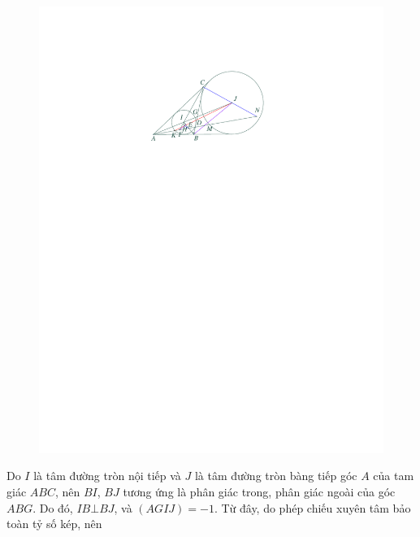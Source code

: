 \begin{multicols}{2}
\begin{figure}[H]
		\centering
		\captionsetup{labelformat= empty, justification=centering}
		\includegraphics[width= 1\linewidth]{P738}
		\vspace*{-10pt}
	\end{figure}
	Do $I$ là tâm đường tròn nội tiếp và $J$  là tâm đường tròn bàng tiếp góc $A$ của tam giác $ABC$, nên $BI$, $BJ$ tương ứng là phân giác trong, phân giác ngoài của góc $ABG$. Do đó, $IB \bot BJ$, và  $\left( {AGIJ} \right) =  - 1.$ Từ đây, do phép chiếu xuyên tâm bảo toàn tỷ số kép, nên
	

\end{multicols}
